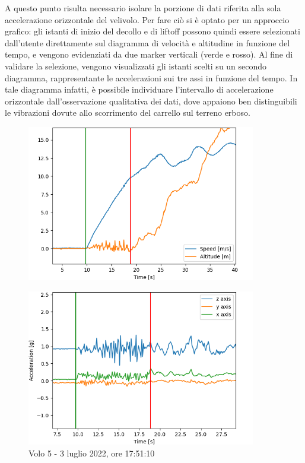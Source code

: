 \documentclass[12pt]{article}
\begin{document}
A questo punto risulta necessario isolare la porzione di dati riferita alla sola accelerazione orizzontale del velivolo. Per fare ciò si è optato per un approccio grafico: gli istanti di inizio del decollo e di liftoff possono quindi essere selezionati dall'utente direttamente sul diagramma di velocità e altitudine in funzione del tempo, e vengono evidenziati da due marker verticali (verde e rosso).
Al fine di validare la selezione, vengono visualizzati gli istanti scelti su un secondo diagramma, rappresentante le accelerazioni sui tre assi in funzione del tempo. In tale diagramma infatti, è possibile individuare l'intervallo di accelerazione orizzontale dall'osservazione qualitativa dei dati, dove appaiono ben distinguibili le vibrazioni dovute allo scorrimento del carrello sul terreno erboso.

\begin{figure}[H]
	\centering
	\includegraphics[width=10cm]{img/select-to-1}
\end{figure}

\vspace{-0.5cm}

\begin{figure}[H]
	\centering
	\includegraphics[width=10cm]{img/select-to-2}
	\captionsetup{labelformat=empty}
	\caption{Volo 5 - 3 luglio 2022, ore 17:51:10}
\end{figure}
\end{document}
